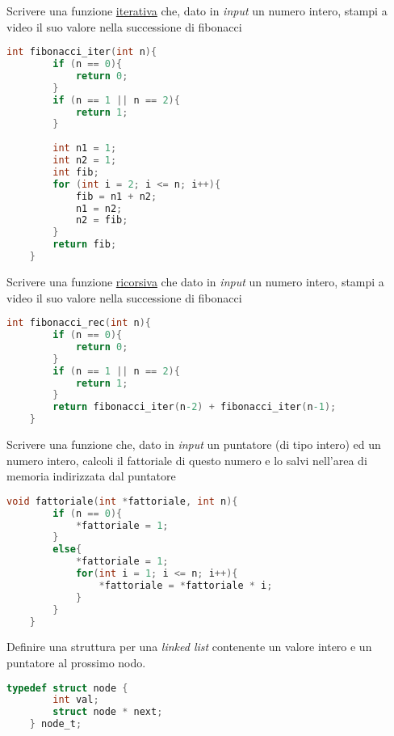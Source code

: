 \documentclass[addpoints,11pt]{exam}
\begin{document}
\begin{questions}
\question[2]
Scrivere una funzione \underline{iterativa} che, dato in \emph{input} un numero intero, stampi a video il suo valore nella successione di fibonacci

\begin{minipage}[t]{0.5\linewidth}
	\begin{lstlisting}[language=C]
	int fibonacci_iter(int n){
		if (n == 0){
			return 0;
		}
		if (n == 1 || n == 2){
			return 1;
		}
		
		int n1 = 1;
		int n2 = 1;
		int fib;
		for (int i = 2; i <= n; i++){
			fib = n1 + n2;
			n1 = n2;
			n2 = fib;
		}
		return fib;
	}
	\end{lstlisting}
\end{minipage}



\question[2]
Scrivere una funzione \underline{ricorsiva} che dato in \emph{input} un numero intero, stampi a video il suo valore nella successione di fibonacci

\begin{minipage}[t]{0.5\linewidth}
	\begin{lstlisting}[language=C]
	int fibonacci_rec(int n){
		if (n == 0){
			return 0;
		}
		if (n == 1 || n == 2){
			return 1;
		}		
		return fibonacci_iter(n-2) + fibonacci_iter(n-1);
	}
	\end{lstlisting}
\end{minipage}



\question [1]
Scrivere una funzione che, dato in \emph{input} un puntatore (di tipo intero) ed un numero intero, calcoli il fattoriale di questo numero e lo salvi nell'area di memoria indirizzata dal puntatore


\begin{minipage}[t]{0.5\linewidth}
	\begin{lstlisting}[language=C]
	void fattoriale(int *fattoriale, int n){
		if (n == 0){
			*fattoriale = 1;
		}
		else{
			*fattoriale = 1;
			for(int i = 1; i <= n; i++){
				*fattoriale = *fattoriale * i;
			}
		}
	}
	\end{lstlisting}
\end{minipage}



\question[1] 
Definire una struttura per una \emph{linked list} contenente un valore intero e un puntatore al prossimo nodo.


\begin{minipage}[t]{0.5\linewidth}
	\begin{lstlisting}[language=C]
	typedef struct node {
		int val;
		struct node * next;
	} node_t;
	\end{lstlisting}
\end{minipage}




\end{questions}
\end{document}
